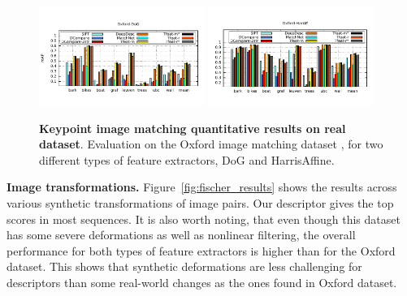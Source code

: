 \begin{figure}
\centering
\includegraphics[trim={0.5cm 1.2cm 0.5cm 1.8cm},width=0.48\textwidth]{main/chapter02/images/oxford_dog}
\includegraphics[trim={0.5cm 1.2cm 0.5cm 1.8cm},width=0.48\textwidth]{main/chapter02/images/oxford_haraff}
\caption[Keypoint image matching quantitative results on real dataset]{\textbf{Keypoint image matching quantitative results on real dataset}. Evaluation on the Oxford image matching dataset
  \cite{schmid2003performance}, for two different types of feature
  extractors, DoG and  HarrisAffine.}
\label{fig:oxford_results}
\vspace{-0.2cm}
\end{figure}

\textbf{Image transformations.} Figure~\ref{fig:fischer_results} shows the results across various synthetic transformations of image pairs. Our descriptor gives the  top scores in most sequences. It is also worth noting, that even though this dataset has some severe deformations as well as nonlinear filtering, the overall performance for both types of feature extractors is higher than for the Oxford dataset. This shows that synthetic deformations are less challenging for descriptors than some real-world changes as the ones found in Oxford dataset.

